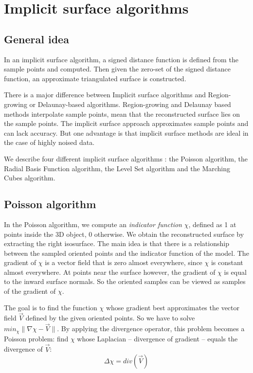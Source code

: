 \documentclass[a4paper]{article}
\begin{document}
\section{Implicit surface algorithms}
\subsection{General idea}
In an implicit surface algorithm, a signed distance function is defined from the sample points and computed. Then given the zero-set of the signed distance function, an approximate triangulated surface is constructed.

There is a major difference between Implicit surface algorithms and Region-growing or Delaunay-based algorithms. Region-growing and Delaunay based methods interpolate sample points, mean that the reconstructed surface lies on the sample points. The implicit surface approach approximates sample points and can lack accuracy. But one advantage is that implicit surface methods are ideal in the case of highly noised data.

We describe four different implicit surface algorithms : the Poisson algorithm, the Radial Basis Function algorithm, the Level Set algorithm and the Marching Cubes algorithm.


\subsection{Poisson algorithm}
In the Poisson algorithm, we compute an \emph{indicator function} $\chi$, defined as 1 at points inside the 3D object, 0 otherwise. We obtain the reconstructed surface by extracting the right isosurface. The main idea is that there is a relationship between the sampled oriented points and the indicator function of the model. The gradient of $\chi$ is  a vector field that is zero almost everywhere, since $\chi$ is constant almost everywhere. At points near the surface however, the gradient of $\chi$ is equal to the inward surface normals. So the oriented samples can be viewed as samples of the gradient of $\chi$.

The goal is to find the function $\chi$ whose gradient best approximates the vector field $\vec{V}$ defined by the given oriented points. So we have to solve $min_\chi\|\nabla\chi - \vec{V}\|$. By applying the divergence operator, this problem becomes a Poisson problem: find $\chi$ whose Laplacian -- divergence of gradient -- equals the divergence of $\vec{V}$:
$$\Delta\chi = div(\vec{V})$$
\end{document}
